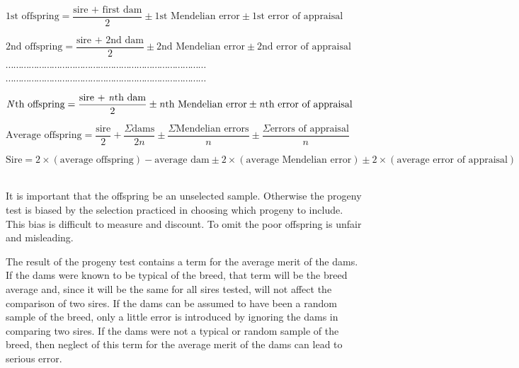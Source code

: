 ~\\
\setlength{\parskip}{6pt}
\noindent
\( \textrm{1st offspring} = \dfrac{\textrm{sire + first dam}}{2} \pm \textrm{1st Mendelian error} \pm \textrm{1st error of appraisal} \)

\noindent
\( \textrm{2nd offspring} = \dfrac{\text{sire + 2nd dam}}{2} \pm \textrm{2nd Mendelian error} \pm \textrm{2nd error of appraisal} \)

\noindent
\( \cdots\cdots\cdots\cdots\cdots\cdots\cdots\cdots\cdots\cdots\cdots\cdots\cdots\cdots\cdots\cdots\cdots\cdots\cdots\cdots\cdots\cdots\cdots\cdots\cdots\cdots \)

\noindent
\( \cdots\cdots\cdots\cdots\cdots\cdots\cdots\cdots\cdots\cdots\cdots\cdots\cdots\cdots\cdots\cdots\cdots\cdots\cdots\cdots\cdots\cdots\cdots\cdots\cdots\cdots \)

\noindent
\( \textrm{\textit{N}th offspring} = \dfrac{\textrm{sire + \textit{n}th dam}}{2} \pm \textrm{\textit{n}th Mendelian error} \pm \textrm{\textit{n}th error of appraisal} \)

\noindent
\( \textrm{Average offspring} = \dfrac{\text{sire}}{2} + \dfrac{\Sigma\textrm{dams}}{2n} \pm \dfrac{\Sigma\textrm{Mendelian errors}}{n} \pm \dfrac{\Sigma\textrm{errors of appraisal}}{n} \)

\noindent\label{eqn-page-198}
\( \textrm{Sire} = 2 \times (\textrm{average offspring}) -
	\textrm{average dam} \pm 2 \times (\textrm{average Mendelian error}) 
	\pm \allowbreak 2 \times (\textrm{average error of appraisal}) \)

\setlength{\parskip}{1pt}
~\\
It is important that the offspring be an unselected sample. Otherwise
the progeny test is biased by the selection practiced in choosing
which progeny to include. This bias is difficult to measure and discount.
To omit the poor offspring is unfair and misleading.

The result of the progeny test contains a term for the average merit
of the dams. If the dams were known to be typical of the breed, that
term will be the breed average and, since it will be the same for all
sires tested, will not affect the comparison of two sires. If the dams can
be assumed to have been a random sample of the breed, only a little
error is introduced by ignoring the dams in comparing two sires. If the
dams were not a typical or random sample of the breed, then neglect of
this term for the average merit of the dams can lead to serious error.


